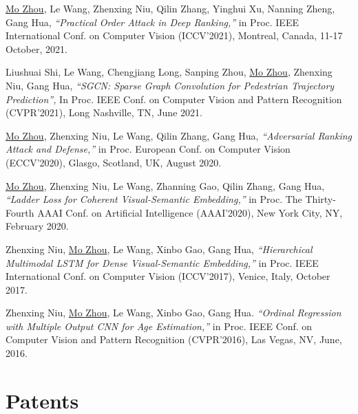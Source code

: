 \documentclass[margin,line,pifont,palatino,courier]{res}
\begin{document}
\begin{resume}
\begin{enumerate}[noitemsep, leftmargin=*, label={[C0{\arabic*}]}]

\item \underline{Mo Zhou}, Le Wang, Zhenxing Niu, Qilin Zhang, Yinghui Xu, Nanning Zheng, Gang Hua,
\textit{``Practical Order Attack in Deep Ranking,''}
in Proc. IEEE International Conf. on Computer Vision (ICCV'2021),
Montreal, Canada, 11-17 October, 2021.

\item Liushuai Shi, Le Wang, Chengjiang Long, Sanping Zhou, \underline{Mo Zhou}, Zhenxing Niu, Gang Hua,
\textit{``SGCN: Sparse Graph Convolution for Pedestrian Trajectory Prediction'',}
In Proc. IEEE Conf. on Computer Vision and Pattern Recognition (CVPR'2021),
Long Nashville, TN, June 2021.

\item \underline{Mo Zhou}, Zhenxing Niu, Le Wang, Qilin Zhang, Gang Hua,
\textit{``Adversarial Ranking Attack and Defense,''}
in Proc. European Conf. on Computer Vision (ECCV'2020),
Glasgo, Scotland, UK, August 2020.

\item  \underline{Mo Zhou}, Zhenxing Niu, Le Wang, Zhanning Gao, Qilin Zhang, Gang Hua,
\textit{``Ladder Loss for Coherent Visual-Semantic Embedding,''}
in Proc. The Thirty-Fourth AAAI Conf. on Artificial Intelligence (AAAI'2020),
New York City, NY, February 2020.

\item Zhenxing Niu, \underline{Mo Zhou}, Le Wang, Xinbo Gao, Gang Hua,
\textit{``Hierarchical Multimodal LSTM for Dense Visual-Semantic Embedding,''}
in Proc. IEEE International Conf. on Computer Vision (ICCV'2017),
Venice, Italy, October 2017.

\item Zhenxing Niu, \underline{Mo Zhou}, Le Wang, Xinbo Gao, Gang Hua.
\textit{``Ordinal Regression with Multiple Output CNN for Age Estimation,''}
in Proc. IEEE Conf. on Computer Vision and Pattern Recognition (CVPR'2016),
Las Vegas, NV, June, 2016.

\end{enumerate}

\section{\sc Patents}

\begin{enumerate}[noitemsep, leftmargin=*, label={[P0{\arabic*}]}]


\end{enumerate}
\end{resume}
\end{document}
